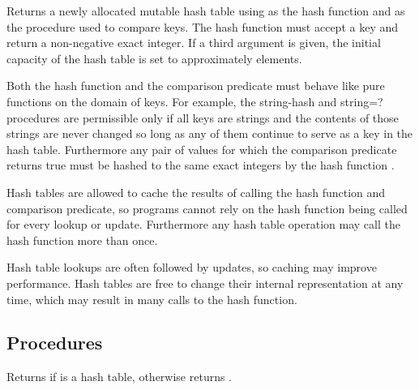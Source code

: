 \begin{entry}{%
}

Returns a newly allocated mutable hash table using  
as the hash function and  as the procedure used to 
compare keys.  The hash function must accept a key and return a 
non-negative exact integer. If a third argument is given, the 
initial capacity of the hash table is set to approximately  elements.

Both the hash function  and the comparison
predicate  must behave like pure functions
on the domain of keys.  For example, the {\cf string-hash}
and {\cf string=?} procedures are permissible only if all
keys are strings and the contents of those strings are never
changed so long as any of them continue to serve as a key in
the hash table.  Furthermore any pair of values for which
the comparison predicate  returns true must
be hashed to the same exact integers by the hash function
.

\begin{note}
Hash tables are allowed to cache the results of calling the
hash function and comparison predicate, so programs cannot
rely on the hash function being called for every lookup or
update.  Furthermore any hash table operation may call the
hash function more than once.
\end{note}

\begin{rationale}
Hash table lookups are often followed by updates, so caching
may improve performance.  Hash tables are free to change
their internal representation at any time, which may result
in many calls to the hash function.
\end{rationale}

\end{entry}

\subsection{Procedures}

\begin{entry}{%
}

Returns \schtrue{} if  is a hash table,
otherwise returns \schfalse.
\end{entry}

